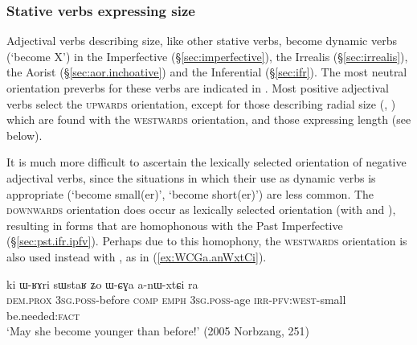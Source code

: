 \subsubsection{Stative verbs expressing size} \label{sec:preverb.adjectives.size}
Adjectival verbs describing size, like other stative verbs, become dynamic verbs (`become X') in the Imperfective (§\ref{sec:imperfective}), the Irrealis (§\ref{sec:irrealis}), the Aorist (§\ref{sec:aor.inchoative}) and the Inferential (§\ref{sec:ifr}). The most neutral orientation preverbs for these verbs are indicated in . Most positive adjectival verbs select the \textsc{upwards} orientation, except for those describing radial size (, ) which are  found with the \textsc{westwards} orientation, and those expressing length (see below).

It is much more difficult to ascertain the lexically selected orientation of negative adjectival verbs, since the situations in which their use as dynamic verbs is appropriate (`become small(er)', `become short(er)') are less common. The \textsc{downwards} orientation does occur as lexically selected orientation (with   and ), resulting in forms that are homophonous with the Past Imperfective (§\ref{sec:pst.ifr.ipfv}). Perhaps due to this homophony, the \textsc{westwards} orientation is also used instead with , as in (\ref{ex:WCGa.anWxtCi}).

\begin{exe}
\ex \label{ex:WCGa.anWxtCi}
\gll ki ɯ-ʁɤri sɯstaʁ ʑo ɯ-ɕɣa a-nɯ-xtɕi ra \\
\textsc{dem}.\textsc{prox} \textsc{3sg}.\textsc{poss}-before \textsc{comp} \textsc{emph} \textsc{3sg}.\textsc{poss}-age \textsc{irr}-\textsc{pfv}:\textsc{west}-small be.needed:\textsc{fact} \\
\glt `May she become younger than before!' (2005 Norbzang, 251)
\end{exe}

